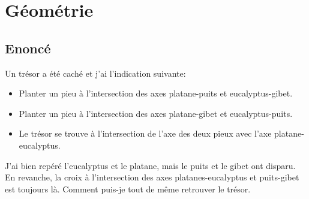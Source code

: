 \documentclass{article}
\newenvironment{statement}{\subsection{Enoncé}}{\pagebreak}
\begin{document}
\section{Géométrie}
\begin{statement}
Un trésor a été caché et j'ai l'indication suivante:
\begin{itemize}
\item
Planter un pieu à l'intersection des axes platane-puits et eucalyptus-gibet.
\item
Planter un pieu à l'intersection des axes platane-gibet et eucalyptus-puits.
\item
Le trésor se trouve à l'intersection de l'axe des deux pieux avec l'axe platane-eucalyptus.
\end{itemize}
J'ai bien repéré l'eucalyptus et le platane, mais le puits et le gibet ont disparu. En revanche, la croix à l'intersection des axes platanes-eucalyptus et puits-gibet est toujours là. Comment puis-je tout de même retrouver le trésor.
\end{statement}
\end{document}
